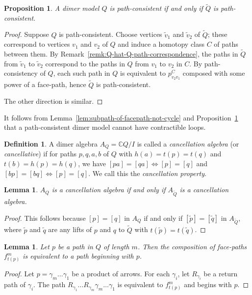 \documentclass{article}
\newtheorem{prop}[thm]{Proposition}
\newtheorem{lemma}[thm]{Lemma}
\theoremstyle{definition}
\newtheorem{defn}[thm]{Definition}
\begin{document}
\begin{prop}\label{prop:Q-consistent-iff-hat-Q-consistent}
        A dimer model $Q$ is path-consistent if and only if $\widetilde Q$ is path-consistent.
\end{prop}
\begin{proof}
	Suppose $Q$ is path-consistent. Choose vertices $\tilde v_1$ and $\tilde v_2$ of $\widetilde Q$; these correspond to vertices $v_1$ and $v_2$ of $Q$ and induce a homotopy class $C$ of paths between them. By Remark~\ref{remk:Q-hat-Q-path-correspondence}, the paths in $\widetilde Q$ from $\tilde v_1$ to  $\tilde v_2$ correspond to the paths in $Q$ from $v_1$ to $v_2$ in $C$. By path-consistency of $Q$, each such path in $Q$ is equivalent to $p_{v_2v_1}^C$ composed with some power of a face-path, hence $\widetilde Q$ is path-consistent.

	The other direction is similar.
\end{proof}

It follows from Lemma~\ref{lem:subpath-of-facepath-not-cycle} and Proposition~\ref{prop:Q-consistent-iff-hat-Q-consistent} that a path-consistent dimer model cannot have contractible loops.

\begin{defn}
	A dimer algebra $A_Q=\mathbb C Q/I$ is called a \textit{cancellation algebra} (or \textit{cancellative}) if for paths $p,q,a,b$ of $Q$ with $h(a)=t(p)=t(q)$ and $t(b)=h(p)=h(q)$, we have $[pa]=[qa]\iff [p]=[q]$ and $[bp]=[bq]\iff [p]=[q]$. We call this the \textit{cancellation property}.
\end{defn}

\begin{lemma}\label{lem:Q-canc-iff-hat-Q-canc}
	$A_Q$ is a cancellation algebra if and only if $A_{\widetilde Q}$ is a cancellation algebra.
\end{lemma}
\begin{proof}
	This follows because $[p]=[q]$ in $A_Q$ if and only if $[\tilde p]=[\tilde q]$ in $A_{\widetilde Q}$, where $\tilde p$ and $\tilde q$ are any lifts of $p$ and $q$ to $\widetilde Q$ with $t(\tilde p)=t(\tilde q)$.
\end{proof}


\begin{lemma}\label{lem:many-cycles-factor-through-path}
	Let $p$ be a path in $Q$ of length $m$. Then the composition of face-paths $f^m_{t(p)}$ is equivalent to a path beginning with $p$.
\end{lemma}
\begin{proof}
	Let $p=\gamma_m\dots\gamma_1$ be a product of arrows.
	For each $\gamma_i$, let $R_{\gamma_i}$ be a return path of $\gamma_i$. The path $R_{\gamma_1}\dots R_{\gamma_m}\gamma_m\dots\gamma_1$ is equivalent to $f^m_{t(p)}$ and begins with $p$.
\end{proof}
\end{document}
